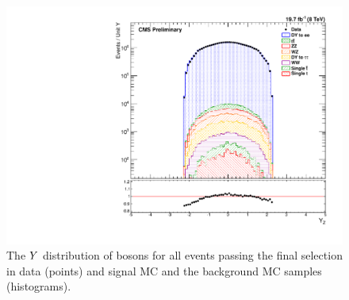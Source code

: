 \begin{figure}[p]
    \centering
    \includegraphics[width=\textwidth]{figures/z_rapidity.pdf}
    \caption[
        The $\rapidity$ distribution of \Z bosons in data and MC with \MADGRAPH
        signal MC.
    ]{
        The $\rapidity$ distribution of \Z bosons for all events passing the
        final selection in data (points) and \MADGRAPH signal MC and the
        background MC samples (histograms).
    }
    \label{fig:z_rapidity}
\end{figure}
